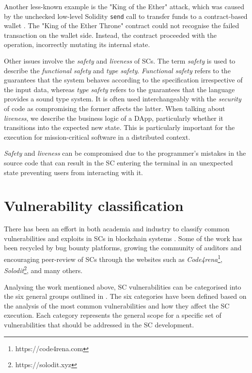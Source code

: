 \documentclass[oneside]{ecsproject}     %
\begin{document}
Another less-known example is the "King of the Ether" attack, which was caused by the unchecked low-level Solidity \texttt{send} call to transfer funds to a contract-based wallet \cite{king_of_the_ether}.
The "King of the Ether Throne" contract could not recognise the failed transaction on the wallet side. Instead, the contract proceeded with the operation, incorrectly mutating its internal state.

Other issues involve the \textit{safety} and \textit{liveness} of SCs. 
The term \textit{safety} is used to describe the \textit{functional safety} and \textit{type safety}. \textit{Functional safety} refers to the guarantees that the system behaves according to the specification irrespective of the input data\cite{func_safety},
whereas \textit{type safety} refers to the guarantees that the language provides a sound type system\cite{types_pierce}.
It is often used interchangeably with the \textit{security} of code
as compromising the former affects the latter. When talking about \textit{liveness}, we describe the business logic of a DApp, particularly whether it transitions into the expected new state\cite{liveness_rob}.
This is particularly important for the execution for mission-critical software in a distributed context.

\textit{Safety} and \textit{liveness} can be compromised due to the programmer's mistakes in the source code that can result in the SC entering the terminal in an unexpected state
preventing users from interacting with it\cite{ondo_report}.


\section{Vulnerability classification}

There has been an effort in both academia and industry to classify common vulnerabilities 
and exploits in SCs in blockchain systems \cite{owasp}\cite{stefano}\cite{atzei_survey}. 
Some of the work has been recycled by bug bounty platforms, growing the community of auditors
and encouraging peer-review of SCs through the websites such as \textit{Code4rena}\footnote{https://code4rena.com}, \textit{Solodit}\footnote{https://solodit.xyz},
and many others.

Analysing the work mentioned above, SC vulnerabilities can be categorised into the six general groups outlined in .
The six categories have been defined based on the analysis of the most common vulnerabilities and how they affect the SC execution. 
Each category represents the general scope for a specific set of vulnerabilities that should be addressed in the SC development.
\end{document}
